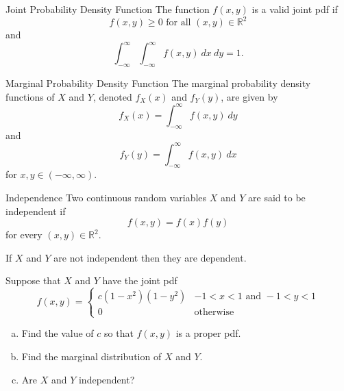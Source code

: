 \begin{frame}
  \begin{block}{Joint Probability Density Function}
  The function $f(x,y)$ is a valid joint pdf if 
  $$
  f(x,y)\geq 0 \mbox{ for all } (x,y) \in \mathbb R^2
  $$
  and 
  $$ 
  \int_{-\infty}^\infty \int_{-\infty}^{\infty} f(x,y)~dx~dy=1.
  $$
  \end{block}
\end{frame}


\begin{frame}
  \begin{block}{Marginal Probability Density Function}
    The marginal probability density functions of $X$ and $Y$, denoted $f_X(x)$ and $f_Y(y)$, are given by
    $$
      f_X(x)=\int_{-\infty}^{\infty}f(x,y)~dy
    $$
    and
    $$
    f_Y(y)=\int_{-\infty}^{\infty}f(x,y)~dx
    $$
    for $x,y \in (-\infty,\infty)$. 
    
  \end{block}
\end{frame}

\begin{frame}
  \begin{block}{Independence}
    Two continuous random variables $X$ and $Y$ are said to be independent if
    \[
      f(x,y)=f(x)f(y)
    \]
    for every $(x,y)\in \mathbb R^2$. 
    
    \bigskip
    
    If $X$ and $Y$ are not independent then they are dependent. 
  \end{block}
\end{frame}

\begin{frame}
  \begin{block}{\example}
    Suppose that $X$ and $Y$ have the joint pdf
    \[
      f(x,y)=
      \left\{
        \begin{array}{ll}
          c(1-x^2)(1-y^2) & -1 < x < 1\mbox{ and } -1 < y < 1\\
          0 & \mbox{otherwise}
        \end{array}
      \right.
    \]
    \begin{enumerate}[a)]
    \item Find the value of $c$ so that $f(x,y)$ is a proper pdf.
    \item Find the marginal distribution of $X$ and $Y$.
    \item Are $X$ and $Y$ independent? 
    \end{enumerate}
  \end{block}
\end{frame}






